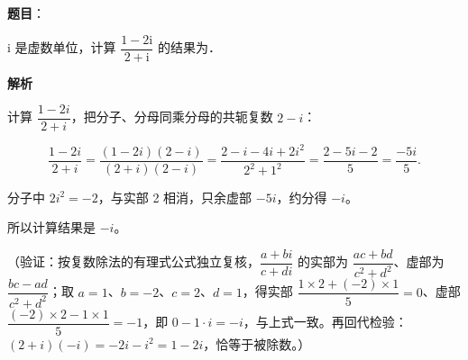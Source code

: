 \begin{answer}

\textbf{题目}：

\(\mathrm{i}\) 是虚数单位，计算 \(\dfrac{1-2\mathrm{i}}{2+\mathrm{i}}\) 的结果为\gkblank{}．

\textbf{解析}

计算 \(\dfrac{1-2i}{2+i}\)，把分子、分母同乘分母的共轭复数 \(2-i\)：

\nopagebreak[4]
\[
\dfrac{1-2i}{2+i}=\dfrac{(1-2i)(2-i)}{(2+i)(2-i)}=\dfrac{2-i-4i+2i^{2}}{2^{2}+1^{2}}=\dfrac{2-5i-2}{5}=\dfrac{-5i}{5}.
\]

分子中 \(2i^{2}=-2\)，与实部 2 相消，只余虚部 \(-5i\)，约分得 \(-i\)。

所以计算结果是 \(-i\)。

（验证：按复数除法的有理式公式独立复核，\(\dfrac{a+bi}{c+di}\) 的实部为 \(\dfrac{ac+bd}{c^{2}+d^{2}}\)、虚部为 \(\dfrac{bc-ad}{c^{2}+d^{2}}\)；取 \(a=1\)、\(b=-2\)、\(c=2\)、\(d=1\)，得实部 \(\dfrac{1\times2+(-2)\times1}{5}=0\)、虚部 \(\dfrac{(-2)\times2-1\times1}{5}=-1\)，即 \(0-1\cdot i=-i\)，与上式一致。再回代检验：\((2+i)(-i)=-2i-i^{2}=1-2i\)，恰等于被除数。）


\end{answer}
